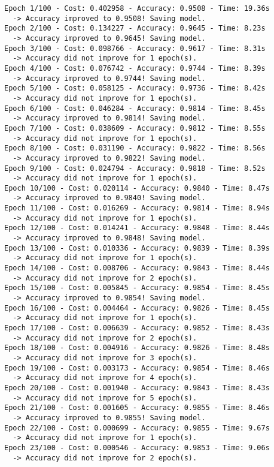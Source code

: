 \documentclass[11pt]{article}
\begin{document}
    \begin{Verbatim}[commandchars=\\\{\}]
Epoch 1/100 - Cost: 0.402958 - Accuracy: 0.9508 - Time: 19.36s
  -> Accuracy improved to 0.9508! Saving model.
Epoch 2/100 - Cost: 0.134227 - Accuracy: 0.9645 - Time: 8.23s
  -> Accuracy improved to 0.9645! Saving model.
Epoch 3/100 - Cost: 0.098766 - Accuracy: 0.9617 - Time: 8.31s
  -> Accuracy did not improve for 1 epoch(s).
Epoch 4/100 - Cost: 0.076742 - Accuracy: 0.9744 - Time: 8.39s
  -> Accuracy improved to 0.9744! Saving model.
Epoch 5/100 - Cost: 0.058125 - Accuracy: 0.9736 - Time: 8.42s
  -> Accuracy did not improve for 1 epoch(s).
Epoch 6/100 - Cost: 0.046284 - Accuracy: 0.9814 - Time: 8.45s
  -> Accuracy improved to 0.9814! Saving model.
Epoch 7/100 - Cost: 0.038609 - Accuracy: 0.9812 - Time: 8.55s
  -> Accuracy did not improve for 1 epoch(s).
Epoch 8/100 - Cost: 0.031190 - Accuracy: 0.9822 - Time: 8.56s
  -> Accuracy improved to 0.9822! Saving model.
Epoch 9/100 - Cost: 0.024794 - Accuracy: 0.9818 - Time: 8.52s
  -> Accuracy did not improve for 1 epoch(s).
Epoch 10/100 - Cost: 0.020114 - Accuracy: 0.9840 - Time: 8.47s
  -> Accuracy improved to 0.9840! Saving model.
Epoch 11/100 - Cost: 0.016269 - Accuracy: 0.9814 - Time: 8.94s
  -> Accuracy did not improve for 1 epoch(s).
Epoch 12/100 - Cost: 0.014241 - Accuracy: 0.9848 - Time: 8.44s
  -> Accuracy improved to 0.9848! Saving model.
Epoch 13/100 - Cost: 0.010336 - Accuracy: 0.9839 - Time: 8.39s
  -> Accuracy did not improve for 1 epoch(s).
Epoch 14/100 - Cost: 0.008706 - Accuracy: 0.9843 - Time: 8.44s
  -> Accuracy did not improve for 2 epoch(s).
Epoch 15/100 - Cost: 0.005845 - Accuracy: 0.9854 - Time: 8.45s
  -> Accuracy improved to 0.9854! Saving model.
Epoch 16/100 - Cost: 0.004464 - Accuracy: 0.9826 - Time: 8.45s
  -> Accuracy did not improve for 1 epoch(s).
Epoch 17/100 - Cost: 0.006639 - Accuracy: 0.9852 - Time: 8.43s
  -> Accuracy did not improve for 2 epoch(s).
Epoch 18/100 - Cost: 0.004916 - Accuracy: 0.9826 - Time: 8.48s
  -> Accuracy did not improve for 3 epoch(s).
Epoch 19/100 - Cost: 0.003173 - Accuracy: 0.9854 - Time: 8.46s
  -> Accuracy did not improve for 4 epoch(s).
Epoch 20/100 - Cost: 0.001940 - Accuracy: 0.9843 - Time: 8.43s
  -> Accuracy did not improve for 5 epoch(s).
Epoch 21/100 - Cost: 0.001605 - Accuracy: 0.9855 - Time: 8.46s
  -> Accuracy improved to 0.9855! Saving model.
Epoch 22/100 - Cost: 0.000699 - Accuracy: 0.9855 - Time: 9.67s
  -> Accuracy did not improve for 1 epoch(s).
Epoch 23/100 - Cost: 0.000546 - Accuracy: 0.9853 - Time: 9.06s
  -> Accuracy did not improve for 2 epoch(s).

\end{Verbatim}
\end{document}
